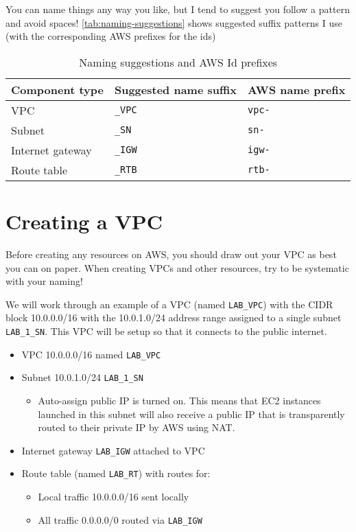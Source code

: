 \documentclass{pgnotes}
\begin{document}
You can name things any way you like, but I tend to suggest you follow a pattern and avoid spaces!
\autoref{tab:naming-suggestions} shows suggested suffix patterns I use (with the corresponding AWS prefixes for the ids)

\begin{table}[htbp]
  \centering
  \begin{tabular}{l l l}
    \toprule
    \textbf{Component type} & \textbf{Suggested name suffix} & \textbf{AWS name prefix} \\
    \midrule
    VPC & \texttt{\_VPC} & \texttt{vpc-} \\
    Subnet & \texttt{\_SN} & \texttt{sn-} \\
    Internet gateway & \texttt{\_IGW} & \texttt{igw-} \\
    Route table & \texttt{\_RTB} & \texttt{rtb-} \\
    \bottomrule
  \end{tabular}
  \caption{Naming suggestions and AWS Id prefixes}
  \label{tab:naming-suggestions}
\end{table}

\section{Creating a VPC}

Before creating any resources on AWS, you should draw out your VPC as best you can on paper.
When creating VPCs and other resources, try to be systematic with your naming!

We will work through an example of a VPC (named \texttt{LAB\_VPC}) with the CIDR block 10.0.0.0/16 with the 10.0.1.0/24 address range assigned to a single subnet \texttt{LAB\_1\_SN}.
This VPC will be setup so that it connects to the public internet.
\begin{itemize}
\item VPC 10.0.0.0/16 named \texttt{LAB\_VPC}
\item Subnet 10.0.1.0/24 \texttt{LAB\_1\_SN}
  \begin{itemize}
  \item Auto-assign public IP is turned on.
    This means that EC2 instances launched in this subnet will also receive a public IP that is transparently routed to their private IP by AWS using NAT.
  \end{itemize}
\item Internet gateway \texttt{LAB\_IGW} attached to VPC
\item Route table (named \texttt{LAB\_RT}) with routes for:
  \begin{itemize}
  \item Local traffic 10.0.0.0/16 sent locally
  \item All traffic 0.0.0.0/0 routed via \texttt{LAB\_IGW}
  \end{itemize}
\end{itemize} 
\end{document}
